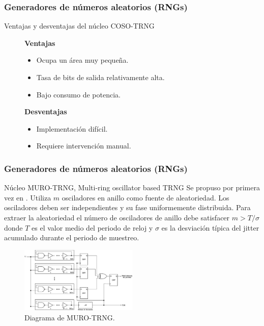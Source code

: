 \documentclass[10pt]{beamer}
\begin{document}
\begin{frame}
    \frametitle{Generadores de números aleatorios (RNGs)}
    \begin{block}{Ventajas y desventajas del núcleo COSO-TRNG}
        \justifying
          \begin{figure}[!h]
				\begin{minipage}[t]{0.48\textwidth}
					\textbf{Ventajas}
					\begin{itemize}
						\justifying
						\item Ocupa un área muy pequeña.
						\item Tasa de bits de salida relativamente alta.
						\item Bajo consumo de potencia.
					\end{itemize}
				\end{minipage} \hfill \begin{minipage}[t]{0.48\textwidth}
					\textbf{Desventajas}
					\begin{itemize}
						\justifying
						\item Implementación difícil.
						\item Requiere intervención manual.
					\end{itemize}
				\end{minipage}
			\end{figure}		
	\end{block}
\end{frame}


\begin{frame}
    \frametitle{Generadores de números aleatorios (RNGs)}
    \begin{block}{Núcleo MURO-TRNG, Multi-ring oscillator based TRNG}
        \justifying
        Se propuso por primera vez en \cite{Sunar2007}. Utiliza $m$ osciladores en anillo como fuente de aleatoriedad. Los osciladores deben ser independientes y su fase uniformemente distribuida. Para extraer la aleatoriedad el número de osciladores de anillo debe satisfacer $m > T/\sigma $ donde $T$ es el valor medio del periodo de reloj y $\sigma$ es la desviación típica del jitter acumulado durante el periodo de muestreo.
	\end{block}
	\begin{figure}[hbtp]
	    \centering
	    \includegraphics[width=0.5\textwidth]{A3_MURO_TRNG}
	    \caption{Diagrama de MURO-TRNG.}
        \label{fig:A3_MURO_TRNG}
    \end{figure}
\end{frame}
\end{document}

